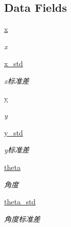 \subsection*{Data Fields}
\begin{DoxyCompactItemize}
\item 
\hyperlink{classselect___a_1_1_a_m_c_l__unit_aed5af027077566ab39d877b032c945ce}{x}
\begin{DoxyCompactList}\small\item\em x \end{DoxyCompactList}\item 
\hyperlink{classselect___a_1_1_a_m_c_l__unit_a17b2d7af35d7f57e099186342795ce1f}{x\+\_\+std}
\begin{DoxyCompactList}\small\item\em x标准差 \end{DoxyCompactList}\item 
\hyperlink{classselect___a_1_1_a_m_c_l__unit_aa3c872f0b168a96e00139193ad907ec2}{y}
\begin{DoxyCompactList}\small\item\em y \end{DoxyCompactList}\item 
\hyperlink{classselect___a_1_1_a_m_c_l__unit_af9142ea0b3e656b6af944affad41f8ed}{y\+\_\+std}
\begin{DoxyCompactList}\small\item\em y标准差 \end{DoxyCompactList}\item 
\hyperlink{classselect___a_1_1_a_m_c_l__unit_a777c829fdf9f1498d17d062dc8ef9c5a}{theta}
\begin{DoxyCompactList}\small\item\em 角度 \end{DoxyCompactList}\item 
\hyperlink{classselect___a_1_1_a_m_c_l__unit_a7177696c739d3edf0837f9d6781eb623}{theta\+\_\+std}
\begin{DoxyCompactList}\small\item\em 角度标准差 \end{DoxyCompactList}\end{DoxyCompactItemize}
